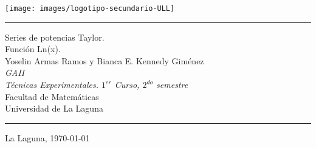 \documentclass[spanish,a4paper,11pt,twoside]{report}
\newcommand{\HRule}{\rule{\linewidth}{1mm}}
\begin{document}
\begin{center}
\texttt{[image: images/logotipo-secundario-ULL]}\\[0.25cm]
\end{center}

\HRule
\begin{center}
        {\Huge Series de potencias Taylor.} \\[2.5mm]                                                          
        {\Huge Función  Ln(x). } \\[2.5mm]
        {\Large Yoselin Armas Ramos y Bianca E. Kennedy Giménez} \\[5mm]
        {\Large \textit{GAII }} \\[5mm]


        {\em Técnicas Experimentales. $1^{er}$ Curso, $2^{do}$ semestre} \\[5mm]
        Facultad de Matemáticas \\[5mm]
        Universidad de La Laguna \\
\end{center}
\HRule
{}
\begin{center}
  La Laguna, \today 
\end{center}

\begin{abstract}
\begin{flushleft}

El objetivo de esta práctica es demostrar los conocimientos adquiridos en Latex, Beamer y Python cursando la asignatura de Técnicas Experimentales.
Aplicaremos los programas ya mencionados en la realización de un informe sobre la función logaritmo neperiano y su desarrollo de Taylor.
Para ello vamos a retomar toda la información dada en prácticas anteriores:
\begin{itemize}
\item \LaTeX{} : Utilizaremos este programa en la realización del informe que presentaremos sobre $f(x)=Ln(x)$
\item Beamer : Recurriremos a la creación de diapositivas para orientarnos en la exposición oral del trabajo.
\item Python : Crearemos un programa en lenguaje interpretado Python para respaldar nuestras afirmaciones sobre el tema planteado.
\end{itemize}
\end{flushleft}
\end{abstract}
\end{document}
